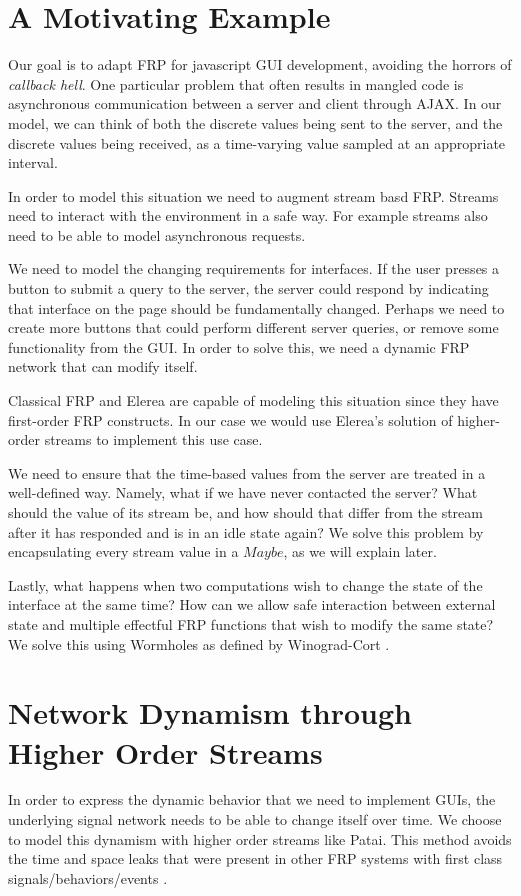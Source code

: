 \documentclass[twocolumn,11pt,english]{article}
\begin{document}
\section{A Motivating Example}
Our goal is to adapt FRP for javascript GUI development, avoiding the horrors of \textit{callback hell}. One particular problem that often results in mangled code is asynchronous communication between a server and client through AJAX. In our model, we can think of both the discrete values being sent to the server, and the discrete values being received, as a time-varying value sampled at an appropriate interval. 

In order to model this situation we need to augment stream basd FRP. Streams need to interact with the environment in a safe way. For example streams also need to be able to model asynchronous requests.

We need to model the changing requirements for interfaces. If the user presses a button to submit a query to the server, the server could respond by indicating that interface on the page should be fundamentally changed. Perhaps we need to create more buttons that could perform different server queries, or remove some functionality from the GUI. In order to solve this, we need a dynamic FRP network that can modify itself. 

Classical FRP and Elerea are capable of modeling this situation since they have first-order FRP constructs. In our case we would use Elerea's solution of higher-order streams to implement this use case. 

We need to ensure that the time-based values from the server are treated in a well-defined way. Namely, what if we have never contacted the server? What should the value of its stream be, and how should that differ from the stream after it has responded and is in an idle state again? We solve this problem by encapsulating every stream value in a $Maybe$, as we will explain later. 

Lastly, what happens when two computations wish to change the state of the interface at the same time? How can we allow safe interaction between external state and multiple effectful FRP functions that wish to modify the same state? We solve this using Wormholes as defined by Winograd-Cort \cite{WinogradCort2012HS}.

\section{Network Dynamism through Higher Order Streams}
In order to express the dynamic behavior that we need to implement GUIs, the underlying signal network needs to be able to change itself over time. We choose to model this dynamism with higher order streams like Patai\cite{HighOrderStreams}. This method avoids the time and space leaks that were present in other FRP systems with first class signals/behaviors/events \cite{ElliottHudak97:Fran}. 
\end{document}
